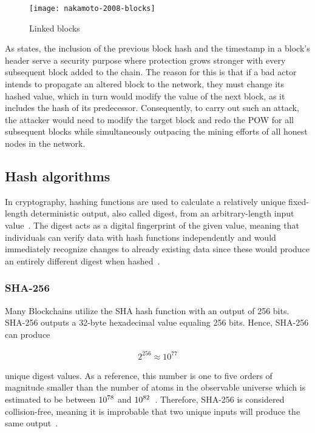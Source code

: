 \begin{figure}[h]
    \texttt{[image: nakamoto-2008-blocks]}
    \caption[Linked blocks]{Linked blocks~\autocite{nakamoto_bitcoin_2008}}
    \label{fig:prev-block-hash}
\end{figure}

As \textcite[2-3]{nakamoto_bitcoin_2008} states, the inclusion of the previous block hash and the timestamp in a block's header serve a security purpose where protection grows stronger with every subsequent block added to the chain.
The reason for this is that if a bad actor intends to propagate an altered block to the network, they must change its hashed value, which in turn would modify the value of the next block, as it includes the hash of its predecessor.
Consequently, to carry out such an attack, the attacker would need to modify the target block and redo the \gls{POW} for all subsequent blocks while simultaneously outpacing the mining efforts of all honest nodes in the network.

\subsection{Hash algorithms}\label{subsec:hash-algorithms}

In cryptography, hashing functions are used to calculate a relatively unique fixed-length deterministic output, also called digest, from an arbitrary-length input value~\autocite[188]{antonopoulos_mastering_2017}.
The digest acts as a digital fingerprint of the given value, meaning that individuals can verify data with hash functions independently and would immediately recognize changes to already existing data since these would produce an entirely different digest when hashed~\autocites[188-189]{antonopoulos_mastering_2017}[7]{yaga_blockchain_2018}.

\subsubsection{SHA-256}
Many \glspl{Blockchain} utilize the \gls{SHA} hash function with an output of 256 bits.
SHA-256 outputs a 32-byte hexadecimal value equaling 256 bits.
Hence, SHA-256 can produce

\begin{align}\label{eq:unique-digest-values}
    2^{256}\approx10^{77}
\end{align}

unique digest values.
As a reference, this number is one to five orders of magnitude smaller than the number of atoms in the observable universe which is estimated to be between \begin{math}10\textsuperscript{78}\end{math} and \begin{math}10\textsuperscript{82}\end{math}~\autocite{villanueva_how_2009}.
Therefore, SHA-256 is considered collision-free, meaning it is improbable that two unique inputs will produce the same output~\autocite[8]{yaga_blockchain_2018}.

